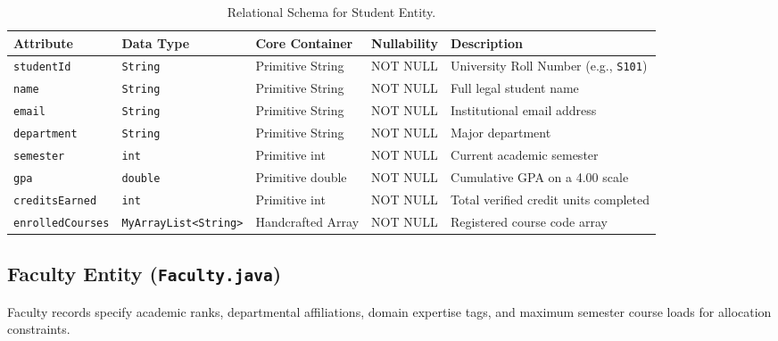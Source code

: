 \begin{table}[H]
\centering
\small
\begin{tabularx}{\textwidth}{llllX}
\toprule
\textbf{Attribute} & \textbf{Data Type} & \textbf{Core Container} & \textbf{Nullability} & \textbf{Description} \\
\midrule
\texttt{studentId} & \texttt{String} & Primitive String & NOT NULL & University Roll Number (e.g., \texttt{S101}) \\
\texttt{name} & \texttt{String} & Primitive String & NOT NULL & Full legal student name \\
\texttt{email} & \texttt{String} & Primitive String & NOT NULL & Institutional email address \\
\texttt{department} & \texttt{String} & Primitive String & NOT NULL & Major department \\
\texttt{semester} & \texttt{int} & Primitive int & NOT NULL & Current academic semester \\
\texttt{gpa} & \texttt{double} & Primitive double & NOT NULL & Cumulative GPA on a 4.00 scale \\
\texttt{creditsEarned} & \texttt{int} & Primitive int & NOT NULL & Total verified credit units completed \\
\texttt{enrolledCourses} & \texttt{MyArrayList<String>} & Handcrafted Array & NOT NULL & Registered course code array \\
\bottomrule
\end{tabularx}
\caption{Relational Schema for Student Entity.}
\label{tab:student_schema}
\end{table}

\subsection{Faculty Entity (\texttt{Faculty.java})}
Faculty records specify academic ranks, departmental affiliations, domain expertise tags, and maximum semester course loads for allocation constraints.

